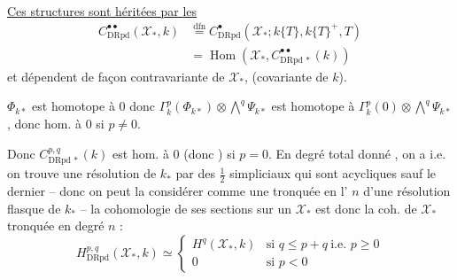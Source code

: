 \uline{Ces structures sont héritées par les}
\[
\boxed{\begin{aligned}
C^{\bullet\bullet}_{\mathrm{DRpd}}(\mathcal X_*,k)&\overset{\mathrm{dfn}}=C^\bullet_{\mathrm{DRpd}}(\mathcal X_*;k\{T\},k\{T\}^+,T)\\
&=\operatorname{Hom}(\mathcal X_*,C^{\bullet\bullet}_{\mathrm{DRpd}\,*}(k))
\end{aligned}}
\]
et dépendent de façon contravariante de $\mathcal X_*$, (covariante de $k$).

$\Phi_{k*}$ est   homotope à 0 donc $\Gamma^p_k(\Phi_{k*})\otimes\bigwedge^q\Psi_{k*}$  est homotope à $\Gamma^p_k(0)\otimes\bigwedge^q\Psi_{k*}$, donc hom. à 0 si $p\ne0$.

Donc $C^{p,q}_{\mathrm{DRpd}\,*}(k)$ est hom. à 0 (donc  ) si $p=0$. En degré total donné , on a
i.e. on trouve une résolution   de $k_*$ par des   $\frac12$ simpliciaux qui sont acycliques sauf le dernier -- donc on peut la considérer comme une tronquée en l'  $n$ d'une résolution flasque de $k_*$ -- la cohomologie de ses sections sur un $\mathcal X_*$ est donc la coh. de $\mathcal X_*$ tronquée en degré $n$ :
\[
H^{p,q}_{\mathrm{DRpd}}(\mathcal X_*,k)\simeq
\begin{cases}
H^q(\mathcal X_*,k)&\text{si }q\leq p+q\ \text{i.e. }p\geq0\\
0&\text{si }p<0
\end{cases}
\]
